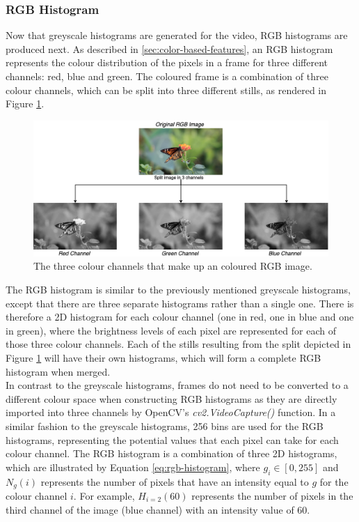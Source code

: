 
\subsubsection{RGB Histogram}

Now that greyscale histograms are generated for the video, RGB histograms are produced next. As described in \ref{sec:color-based-features}, an RGB histogram represents the colour distribution of the pixels in a frame for three different channels: red, blue and green. The coloured frame is a combination of three colour channels, which can be split into three different stills, as rendered in Figure \ref{fig:implementation-rgb_image_channel_split}.

\begin{figure}[h] 
\centerline{\includegraphics[width=\textwidth]{figures/implementation/rgb_image_channel_split.png}}
\caption{\label{fig:implementation-rgb_image_channel_split}The three colour channels that make up an coloured RGB image.}
\end{figure}

The RGB histogram is similar to the previously mentioned greyscale histograms, except that there are three separate histograms rather than a single one. There is therefore a 2D histogram for each colour channel (one in red, one in blue and one in green), where the brightness levels of each pixel are represented for each of those three colour channels. Each of the stills resulting from the split depicted in Figure \ref{fig:implementation-rgb_image_channel_split} will have their own histograms, which will form a complete RGB histogram when merged.\\

In contrast to the greyscale histograms, frames do not need to be converted to a different colour space when constructing RGB histograms as they are directly imported into three channels by OpenCV's \textit{cv2.VideoCapture()} function. In a similar fashion to the greyscale histograms, 256 bins are used for the RGB histograms, representing the potential values that each pixel can take for each colour channel. The RGB histogram is a combination of three 2D histograms, which are illustrated by Equation \ref{eq:rgb-histogram}, where $g_i\in [0, 255]$ and $N_g(i)$ represents the number of pixels that have an intensity equal to $g$ for the colour channel $i$. For example, $H_{i=2}(60)$ represents the number of pixels in the third channel of the image (blue channel) with an intensity value of 60.

